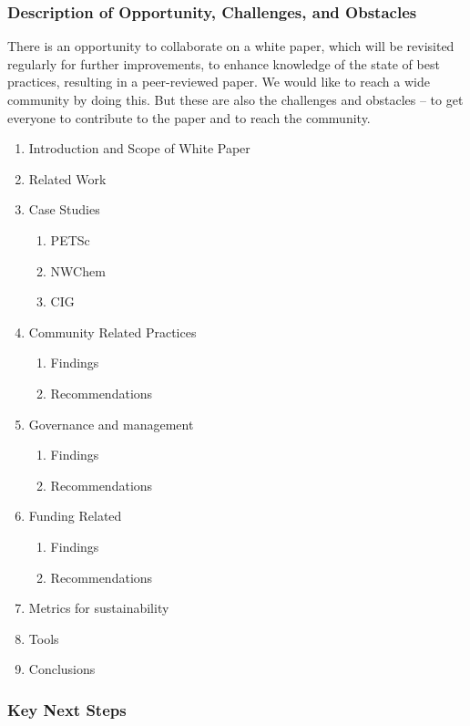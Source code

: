\subsubsection{Description of Opportunity, Challenges, and Obstacles}

There is an opportunity to collaborate on a white paper, which will be revisited
regularly for further improvements, to enhance knowledge of the state of best
practices, resulting in a peer-reviewed paper. We would like to reach a wide
community by doing this. But these are also the challenges and obstacles -- to
get everyone to contribute to the paper and to reach the community.

\medskip
{}
\begin{enumerate}
\item Introduction and Scope of White Paper 
\item Related Work
\item Case Studies
\begin{enumerate} 
\item PETSc
\item NWChem
\item CIG
\end{enumerate}
\item Community Related Practices
\begin{enumerate} 
\item Findings
\item Recommendations
\end{enumerate}
\item Governance and management
\begin{enumerate} 
\item Findings
\item Recommendations
\end{enumerate}
\item Funding Related
\begin{enumerate} 
\item Findings
\item Recommendations
\end{enumerate}
\item Metrics for sustainability
\item Tools
\item Conclusions
\end{enumerate}

\subsubsection{Key Next Steps}

